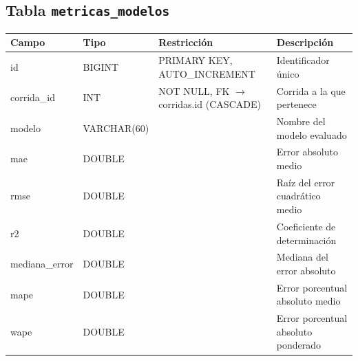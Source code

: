 \subsection*{Tabla \texttt{metricas\_modelos}}
\begin{table}[H]
\centering
\renewcommand{\arraystretch}{1.3}
\begin{tabularx}{\textwidth}{|>{\raggedright\arraybackslash}p{3.0cm}|l|>{\raggedright\arraybackslash}p{3.2cm}|X|}
\hline
\textbf{Campo} & \textbf{Tipo} & \textbf{Restricción} & \textbf{Descripción} \\
\hline
id & BIGINT & PRIMARY KEY, AUTO\_\discretionary{}{}{}INCREMENT & Identificador único \\
\hline
corrida\_\discretionary{}{}{}id & INT & NOT NULL, FK $\to$ corridas.id (CASCADE) & Corrida a la que pertenece \\
\hline
modelo & VARCHAR(60) & & Nombre del modelo evaluado \\
\hline
mae & DOUBLE & & Error absoluto medio \\
\hline
rmse & DOUBLE & & Raíz del error cuadrático medio \\
\hline
r2 & DOUBLE & & Coeficiente de determinación \\
\hline
mediana\_\discretionary{}{}{}error & DOUBLE & & Mediana del error absoluto \\
\hline
mape & DOUBLE & & Error porcentual absoluto medio \\
\hline
wape & DOUBLE & & Error porcentual absoluto ponderado \\
\hline
\end{tabularx}
\end{table}

